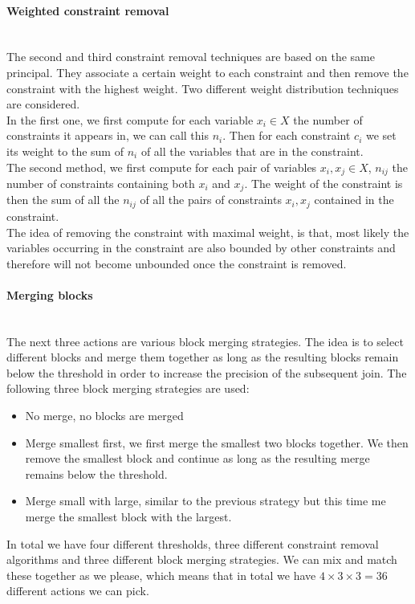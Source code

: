 \paragraph{Weighted constraint removal}\mbox{}\\
The second and third constraint removal techniques are based on the same principal. They associate a certain weight to each constraint  and then remove the constraint with the highest weight. Two different weight distribution techniques are considered. \\
In the first one, we first compute for each variable $x_i \in X$ the number of constraints it appears in, we can call this $n_i$. Then for each constraint $c_i$ we set its weight to the sum of $n_i$ of all the variables that are in the constraint.\\
The second method, we first compute for each pair of variables $x_i,x_j\in X$, $n_{ij}$ the number of constraints containing both $x_i$ and $x_j$. The weight of the constraint is then the sum of all the $n_{ij}$ of all the pairs of constraints $x_i,x_j$ contained in the constraint.\\
The idea of removing the constraint with maximal weight, is that, most likely the variables occurring in the constraint are also bounded by other constraints and therefore will not become unbounded once the constraint is removed.
\paragraph{Merging blocks}\mbox{}\\
The next three actions are various block merging strategies. The idea is to select different blocks and merge them together as long as the resulting blocks remain below the threshold in order to increase the precision of the subsequent join. The following three block merging strategies are used:
\begin{itemize}
	\item No merge, no blocks are merged
	\item Merge smallest first, we first merge the smallest two blocks together. We then remove the smallest block and continue as long as the resulting merge remains below the threshold.
	\item Merge small with large, similar to the previous strategy but this time me merge the smallest block with the largest.
\end{itemize}

In total we have four different thresholds, three different constraint removal algorithms and three different block merging strategies. We can mix and match these together as we please, which means that in total we have $4\times 3\times 3 =36$ different actions we can pick.


